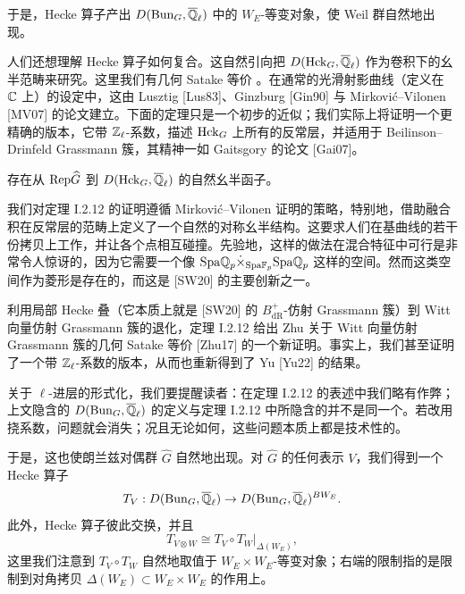 于是，Hecke 算子产出 $D(\mathrm{Bun}_G,\overline{\mathbb{Q}}_\ell)$ 中的 $W_E$-等变对象，使 Weil 群自然地出现。

人们还想理解 Hecke 算子如何复合。这自然引向把 $D(\mathrm{Hck}_G,\overline{\mathbb{Q}}_\ell)$ 作为卷积下的幺半范畴来研究。这里我们有几何 Satake 等价
。在通常的光滑射影曲线（定义在 $\mathbb{C}$ 上）的设定中，这由 Lusztig [Lus83]、Ginzburg [Gin90] 与 Mirković–Vilonen [MV07] 的论文建立。下面的定理只是一个初步的近似；我们实际上将证明一个更精确的版本，它带 $\mathbb{Z}_\ell$-系数，描述 $\mathrm{Hck}_G$ 上所有的反常层，并适用于 Beilinson–Drinfeld Grassmann 簇，其精神一如 Gaitsgory 的论文 [Gai07]。

\begin{theorem}%
存在从 $\mathrm{Rep}\widehat{G}$ 到 $D(\mathrm{Hck}_G,\overline{\mathbb{Q}}_\ell)$ 的自然幺半函子。
\end{theorem}

\begin{remark}%
我们对定理 I.2.12 的证明遵循 Mirković–Vilonen 证明的策略，特别地，借助融合积在反常层的范畴上定义了一个自然的对称幺半结构。这要求人们在基曲线的若干份拷贝上工作，并让各个点相互碰撞。先验地，这样的做法在混合特征中可行是非常令人惊讶的，因为它需要一个像 $\mathrm{Spa}\mathbb{Q}_p\dot\times_{\mathrm{Spa}\mathbb{F}_p}\mathrm{Spa}\mathbb{Q}_p$ 这样的空间。然而这类空间作为菱形是存在的，而这是 [SW20] 的主要创新之一。
\end{remark}

\begin{remark}%
利用局部 Hecke 叠（它本质上就是 [SW20] 的 $B^+_{\mathrm{dR}}$-仿射 Grassmann 簇）到 Witt 向量仿射 Grassmann 簇的退化，定理 I.2.12 给出 Zhu 关于 Witt 向量仿射 Grassmann 簇的几何 Satake 等价 [Zhu17] 的一个新证明。事实上，我们甚至证明了一个带 $\mathbb{Z}_\ell$-系数的版本，从而也重新得到了 Yu [Yu22] 的结果。
\end{remark}

\begin{remark}%
关于 $\ell$-进层的形式化，我们要提醒读者：在定理 I.2.12 的表述中我们略有作弊；上文隐含的 $D(\mathrm{Bun}_G,\overline{\mathbb{Q}}_\ell)$ 的定义与定理 I.2.12 中所隐含的并不是同一个。若改用挠系数，问题就会消失；况且无论如何，这些问题本质上都是技术性的。
\end{remark}

于是，这也使朗兰兹对偶群 $\widehat{G}$ 自然地出现。对 $\widehat{G}$ 的任何表示 $V$，我们得到一个 Hecke 算子
\[
  T_V : D(\mathrm{Bun}_G,\overline{\mathbb{Q}}_\ell)\to D(\mathrm{Bun}_G,\overline{\mathbb{Q}}_\ell)^{BW_E}.
\]
此外，Hecke 算子彼此交换，并且
\[
  T_{V\otimes W}\cong T_V\circ T_W|_{\Delta(W_E)},
\]
这里我们注意到 $T_V\circ T_W$ 自然地取值于 $W_E\times W_E$-等变对象；右端的限制指的是限制到对角拷贝 $\Delta(W_E)\subset W_E\times W_E$ 的作用上。

